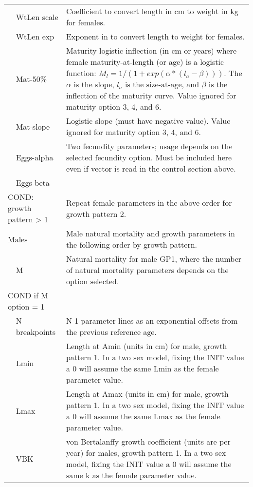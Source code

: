 \begin{longtable}{p{1cm} p{2.25cm} p{10cm}}
	\Tstrut & WtLen scale & Coefficient to convert length in cm to weight in kg for females. \\
	& WtLen exp & Exponent in to convert length to weight for females. \\
	& Mat-50\% & Maturity logistic inflection (in cm or years) where female maturity-at-length (or age) is a logistic function: $M_{l} = 1/(1+exp(\alpha*(l_{a} - \beta)))$. The $\alpha$ is the slope, $l_{a}$ is the size-at-age, and $\beta$ is the inflection of the maturity curve. Value ignored for maturity option 3, 4, and 6. \\ 
	& Mat-slope & Logistic slope (must have negative value). Value ignored for maturity option 3, 4, and 6. \\
	& Eggs-alpha & Two fecundity parameters; usage depends on the selected fecundity option. Must be included here even if vector is read in the control section above. \\
	& Eggs-beta & \Bstrut\\
	\hline

	\multicolumn{2}{l}{COND: growth pattern > 1} \Tstrut & Repeat female parameters in the above order for growth pattern 2. \Bstrut\\
	\hline

	\multicolumn{2}{l}{Males} \Tstrut & Male natural mortality and growth parameters in the following order by growth pattern. \Bstrut\\
	& M & Natural mortality for male GP1, where the number of natural mortality parameters depends on the option selected. \Bstrut\\
	\hline
	\multicolumn{2}{l}{COND if M option = 1} & \Tstrut\\
	& N breakpoints & N-1 parameter lines as an exponential offsets from the previous reference age. \Bstrut\\
	\hline
		
	& Lmin & Length at Amin (units in cm) for male, growth pattern 1. In a two sex model, fixing the INIT value a 0 will assume the same Lmin as the female parameter value. \\
	& Lmax & Length at Amax (units in cm) for male, growth pattern 1. In a two sex model, fixing the INIT value a 0 will assume the same Lmax as the female parameter value. \\
	& VBK & von Bertalanffy growth coefficient (units are per year) for males, growth pattern 1. In a two sex model, fixing the INIT value a 0 will assume the same k as the female parameter value. \Bstrut\\
	\hline


\end{longtable}

